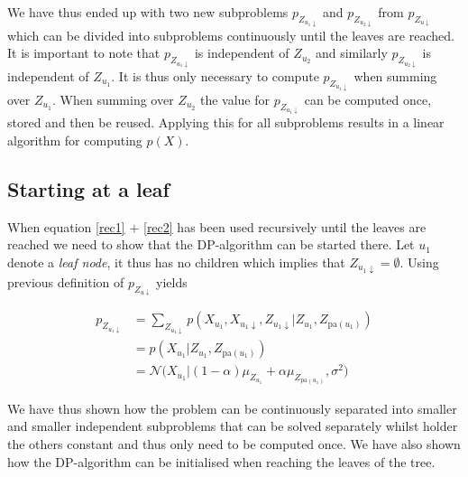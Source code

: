 We have thus ended up with two new subproblems $p_{Z_{u_1\downarrow}}$ and $p_{Z_{u_2\downarrow}}$ from $p_{Z_{u \downarrow}}$ which can be divided into subproblems continuously until the leaves are reached.
\\

It is important to note that $p_{Z_{u_1\downarrow}}$ is independent of $Z_{u_2}$ and similarly $p_{Z_{u_2\downarrow}}$ is independent of $Z_{u_1}$. It is thus only necessary to compute $p_{Z_{u_1\downarrow}}$ when summing over $Z_{u_1}$. When summing over $Z_{u_2}$ the value for $p_{Z_{u_1\downarrow}}$ can be computed once, stored and then be reused. Applying this for all subproblems results in a linear algorithm for computing $p(X)$.


\subsection*{Starting at a leaf}
When equation \eqref{rec1} $+$ \eqref{rec2} has been used recursively until the leaves are reached we need to show that the DP-algorithm can be started there. Let $u_1$ denote a \textit{leaf node}, it thus has no children which implies that $Z_{u_1 \downarrow} = \emptyset$. Using previous definition of $p_{Z_{u \downarrow}}$ yields

 \begin{align}
   p_{Z_{u_1 \downarrow}} & = \sum_{Z_{u_1 \downarrow}} p(X_{u_1}, X_{u_1 \downarrow}, Z_{u_1 \downarrow}|Z_{u_1}, Z_{\text{pa}(u_1)}) \nonumber\\
   & = p(X_{u_1}|Z_{u_1}, Z_{\text{pa}(u_1)}) \nonumber\\
   & = \mathcal{N}\Big(X_{u_1} | (1-\alpha)\mu_{Z_{u_1}} + \alpha \mu_{Z_{\text{pa}(u_1)}}, \sigma^2 \Big)
 \end{align}

 We have thus shown how the problem can be continuously separated into smaller and smaller independent subproblems that can be solved separately whilst holder the others constant and thus only need to be computed once. We have also shown how the DP-algorithm can be initialised when reaching the leaves of the tree.
